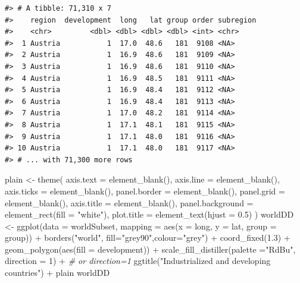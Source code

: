 \documentclass[
  11pt,
  a4paper,
  twoside]{scrbook}
\newenvironment{Shaded}{\begin{snugshade}}{\end{snugshade}}
\newcommand{\AttributeTok}[1]{\textcolor[rgb]{0.77,0.63,0.00}{#1}}
\newcommand{\CommentTok}[1]{\textcolor[rgb]{0.56,0.35,0.01}{\textit{#1}}}
\newcommand{\DecValTok}[1]{\textcolor[rgb]{0.00,0.00,0.81}{#1}}
\newcommand{\FloatTok}[1]{\textcolor[rgb]{0.00,0.00,0.81}{#1}}
\newcommand{\FunctionTok}[1]{\textcolor[rgb]{0.00,0.00,0.00}{#1}}
\newcommand{\NormalTok}[1]{#1}
\newcommand{\OtherTok}[1]{\textcolor[rgb]{0.56,0.35,0.01}{#1}}
\newcommand{\SpecialCharTok}[1]{\textcolor[rgb]{0.00,0.00,0.00}{#1}}
\newcommand{\StringTok}[1]{\textcolor[rgb]{0.31,0.60,0.02}{#1}}
\begin{document}
\begin{verbatim}
#> # A tibble: 71,310 x 7
#>    region  development  long   lat group order subregion
#>    <chr>         <dbl> <dbl> <dbl> <dbl> <int> <chr>    
#>  1 Austria           1  17.0  48.6   181  9108 <NA>     
#>  2 Austria           1  16.9  48.6   181  9109 <NA>     
#>  3 Austria           1  16.9  48.6   181  9110 <NA>     
#>  4 Austria           1  16.9  48.5   181  9111 <NA>     
#>  5 Austria           1  16.9  48.4   181  9112 <NA>     
#>  6 Austria           1  16.9  48.4   181  9113 <NA>     
#>  7 Austria           1  17.0  48.2   181  9114 <NA>     
#>  8 Austria           1  17.1  48.1   181  9115 <NA>     
#>  9 Austria           1  17.1  48.0   181  9116 <NA>     
#> 10 Austria           1  17.1  48.0   181  9117 <NA>     
#> # ... with 71,300 more rows
\end{verbatim}

\linespread{1}

\begin{Shaded}
\begin{Highlighting}[]

\NormalTok{plain }\OtherTok{\textless{}{-}} \FunctionTok{theme}\NormalTok{(}
  \AttributeTok{axis.text =} \FunctionTok{element\_blank}\NormalTok{(),}
  \AttributeTok{axis.line =} \FunctionTok{element\_blank}\NormalTok{(),}
  \AttributeTok{axis.ticks =} \FunctionTok{element\_blank}\NormalTok{(),}
  \AttributeTok{panel.border =} \FunctionTok{element\_blank}\NormalTok{(),}
  \AttributeTok{panel.grid =} \FunctionTok{element\_blank}\NormalTok{(),}
  \AttributeTok{axis.title =} \FunctionTok{element\_blank}\NormalTok{(),}
  \AttributeTok{panel.background =} \FunctionTok{element\_rect}\NormalTok{(}\AttributeTok{fill =} \StringTok{"white"}\NormalTok{),}
  \AttributeTok{plot.title =} \FunctionTok{element\_text}\NormalTok{(}\AttributeTok{hjust =} \FloatTok{0.5}\NormalTok{)}
\NormalTok{)}
\NormalTok{worldDD }\OtherTok{\textless{}{-}} \FunctionTok{ggplot}\NormalTok{(}\AttributeTok{data =}\NormalTok{ worldSubset, }\AttributeTok{mapping =} \FunctionTok{aes}\NormalTok{(}\AttributeTok{x =}\NormalTok{ long, }\AttributeTok{y =}\NormalTok{ lat, }\AttributeTok{group =}\NormalTok{ group)) }\SpecialCharTok{+}
  \FunctionTok{borders}\NormalTok{(}\StringTok{"world"}\NormalTok{, }\AttributeTok{fill=}\StringTok{"grey90"}\NormalTok{,}\AttributeTok{colour=}\StringTok{"grey"}\NormalTok{) }\SpecialCharTok{+} 
  \FunctionTok{coord\_fixed}\NormalTok{(}\FloatTok{1.3}\NormalTok{) }\SpecialCharTok{+}
  \FunctionTok{geom\_polygon}\NormalTok{(}\FunctionTok{aes}\NormalTok{(}\AttributeTok{fill =}\NormalTok{ development)) }\SpecialCharTok{+}
  \FunctionTok{scale\_fill\_distiller}\NormalTok{(}\AttributeTok{palette =}\StringTok{"RdBu"}\NormalTok{, }\AttributeTok{direction =} \DecValTok{1}\NormalTok{) }\SpecialCharTok{+} \CommentTok{\# or direction=1}
  \FunctionTok{ggtitle}\NormalTok{(}\StringTok{"Industrialized and developing countries"}\NormalTok{) }\SpecialCharTok{+}
\NormalTok{  plain}
\NormalTok{worldDD}
\end{Highlighting}
\end{Shaded}
\end{document}
